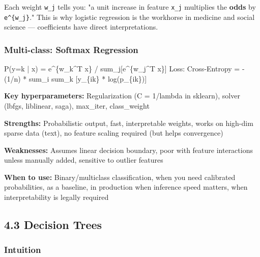 \documentclass[11pt]{article}
\newenvironment{Shaded}{\begin{snugshade}}{\end{snugshade}}
\newcommand{\DecValTok}[1]{\textcolor[rgb]{0.96,0.45,0.00}{#1}}
\newcommand{\NormalTok}[1]{\textcolor[rgb]{0.81,0.81,0.76}{#1}}
\newcommand{\OperatorTok}[1]{\textcolor[rgb]{0.81,0.81,0.76}{#1}}
\begin{document}
Each weight \texttt{w\_j} tells you: "a unit increase in feature \texttt{x\_j} multiplies the \textbf{odds} by \texttt{e\^{}\{w\_j\}}." This is why logistic regression is the workhorse in medicine and social science --- coefficients have direct interpretations.

\subsubsection{Multi-class: Softmax Regression}\label{multi-class-softmax-regression}


\begin{Shaded}
\begin{Highlighting}[]
\NormalTok{P(y}\OperatorTok{=}\NormalTok{k }\OperatorTok{|}\NormalTok{ x) }\OperatorTok{=}\NormalTok{ e}\OperatorTok{\^{}}\NormalTok{\{w\_k}\OperatorTok{\^{}}\NormalTok{T x\} }\OperatorTok{/}\NormalTok{ sum\_j[e}\OperatorTok{\^{}}\NormalTok{\{w\_j}\OperatorTok{\^{}}\NormalTok{T x\}]}
\NormalTok{Loss: Cross}\OperatorTok{{-}}\NormalTok{Entropy }\OperatorTok{=} \OperatorTok{{-}}\NormalTok{(}\DecValTok{1}\OperatorTok{/}\NormalTok{n) }\OperatorTok{*}\NormalTok{ sum\_i sum\_k [y\_\{ik\} }\OperatorTok{*}\NormalTok{ log(p\_\{ik\})]}
\end{Highlighting}
\end{Shaded}

\textbf{Key hyperparameters:} Regularization (C = 1/lambda in sklearn), solver (lbfgs, liblinear, saga), max\_iter, class\_weight

\textbf{Strengths:} Probabilistic output, fast, interpretable weights, works on high-dim sparse data (text), no feature scaling required (but helps convergence)

\textbf{Weaknesses:} Assumes linear decision boundary, poor with feature interactions unless manually added, sensitive to outlier features

\textbf{When to use:} Binary/multiclass classification, when you need calibrated probabilities, as a baseline, in production when inference speed matters, when interpretability is legally required

\subsection{4.3 Decision Trees}\label{43-decision-trees}

\subsubsection{Intuition}\label{intuition-2}
\end{document}
